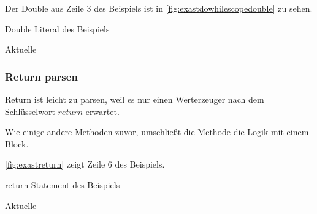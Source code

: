 {      Der Double aus Zeile 3 des Beispiels ist in \autoref{fig:exastdowhilescopedouble} zu sehen.
      \begin{paracol}{2}
        \begin{myCodeEnv}
          \centering
          \begin{myInvBox}[width=.9\linewidth]
            
          \end{myInvBox}
          \caption{Double Literal des Beispiels}
          \label{fig:exastdowhilescopedouble}
        \end{myCodeEnv}
        \switchcolumn
        \begin{myCodeEnv}
          \centering
          \begin{myInvBox}[width=.9\linewidth]
            
          \end{myInvBox}
          \caption*{Aktuelle }
        \end{myCodeEnv}
      \end{paracol}

    \subsubsection{Return parsen}
    \label{sssec:Return parsen}
      Return ist leicht zu parsen, weil es nur einen Werterzeuger nach dem Schlüsselwort \myRIn$return$ erwartet.

      Wie einige andere Methoden zuvor, umschließt die  Methode die Logik mit einem  Block.

      \autoref{fig:exastreturn} zeigt Zeile 6 des Beispiels.
      \begin{paracol}{2}
        \begin{myCodeEnv}
          \centering
          \begin{myInvBox}[width=.9\linewidth]
            
          \end{myInvBox}
          \caption{return Statement des Beispiels}
          \label{fig:exastreturn}
        \end{myCodeEnv}
        \switchcolumn
        \begin{myCodeEnv}
          \centering
          \begin{myInvBox}[width=.9\linewidth]
            
          \end{myInvBox}
          \caption*{Aktuelle }
        \end{myCodeEnv}
      \end{paracol}

}
